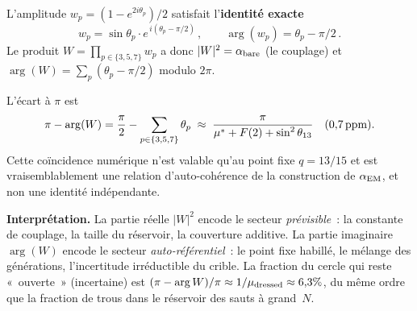 \documentclass[12pt,a4paper]{article}
\begin{document}
\begin{remarque}
\label{rem:complex_phase}
L'amplitude $w_p = (1 - e^{2i\theta_p})/2$ satisfait
l'\textbf{identité exacte}
\begin{equation}
  w_p = \sin\theta_p \cdot e^{\,i(\theta_p - \pi/2)}\,,
  \qquad
  \arg(w_p) = \theta_p - \pi/2\,.
  \label{eq:arg_wp}
\end{equation}
Le produit $W = \prod_{p \in \{3,5,7\}} w_p$ a donc
$|W|^2 = \alpha_{\rm bare}$ (le couplage) et
$\arg(W) = \sum_p (\theta_p - \pi/2)$ modulo $2\pi$.

L'écart à $\pi$ est
\begin{equation}
  \pi - \arg(W) = \frac{\pi}{2} - \sum_{p \in \{3,5,7\}} \theta_p
  \;\approx\; \frac{\pi}{{\mu^{*}} + F(2) + \sin^2\theta_{13}}
  \quad (0{,}7\,\mathrm{ppm}).
  \label{eq:phase_deviation}
\end{equation}
Cette coïncidence numérique n'est valable qu'au point fixe
$q = 13/15$ et est vraisemblablement une relation d'auto-cohérence
de la construction de $\alpha_{\rm EM}$, et non une identité
indépendante.

\textbf{Interprétation.}
La partie réelle $|W|^2$ encode le secteur \emph{prévisible}~: la
constante de couplage, la taille du réservoir, la couverture
additive. La partie imaginaire $\arg(W)$ encode le secteur
\emph{auto-référentiel}~: le point fixe habillé, le mélange des
générations, l'incertitude irréductible du crible. La fraction du
cercle qui reste «~ouverte~» (incertaine) est
$(\pi - \arg W)/\pi \approx 1/\mu_{\rm dressed} \approx 6{,}3\%$,
du même ordre que la fraction de trous dans le réservoir des sauts
à grand~$N$.
\end{remarque}
\end{document}
